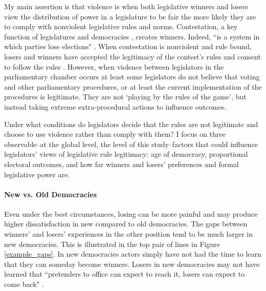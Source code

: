\documentclass[a4paper]{article}\usepackage{graphicx, color}
\begin{document}
My main assertion is that violence is when both legislative winners and losers view the distribution of power in a legislature to be fair the more likely they are to comply with nonviolent legislative rules and norms. Contestation, a key function of legislatures and democracies \citep{Alvarez1996, Dahl1971, Follesdal2006}, creates winners. Indeed, ``is a system in which parties lose elections" \citep[][10]{Przeworski1991}.  When contestation is nonviolent and rule bound, losers and winners have accepted the legitimacy of the contest's rules \citep[][553]{Nadeau1993} and consent to follow the rules \citep[c.f.][]{Anderson2005}. However, when violence between legislators in the parliamentary chamber occurs at least some legislators do not believe that voting and other parliamentary procedures, or at least the current implementation of the procedures is legitimate. They are not `playing by the rules of the game', but instead taking extreme extra-procedural actions to influence outcomes.

Under what conditions do legislators decide that the rules are not legitimate and choose to use violence rather than comply with them? I focus on three observable--at the global level, the level of this study--factors that could influence legislators' views of legislative rule legitimacy: age of democracy, proportional electoral outcomes, and how far winners and losers' preferences and formal legislative power are.


\paragraph{New vs. Old Democracies}

Even under the best circumstances, losing can be more painful and may produce higher dissatisfaction in new compared to old democracies. The gaps between winners' and losers' experiences in the other position tend to be much larger in new democracies. This is illustrated in the top pair of lines in Figure \ref{example_gaps}. In new democracies actors simply have not had the time to learn that they can someday become winners. Losers in new democracies may not have learned that ``pretenders to office can expect to reach it, losers can expect to come back" \citep[][36]{Przeworski1991}. 
\end{document}

